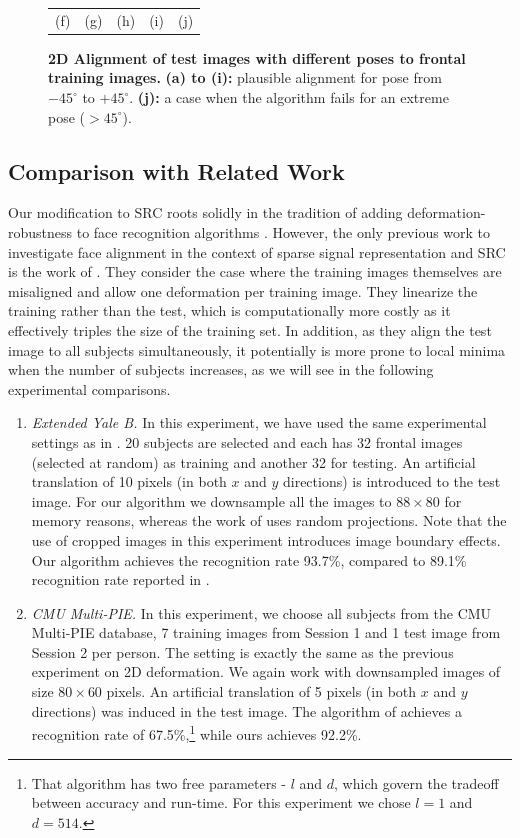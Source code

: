 \documentclass[10pt,journal,letterpaper,compsoc]{IEEEtran} %
\begin{document}
\begin{figure}
{\begin{tabular}{ccccc}
(f) & (g) & (h) & (i) & (j) \vspace{0mm}
\end{tabular}
}
\caption{{\bf 2D Alignment of test images with different poses to frontal training images.} {\bf (a) to (i):}  plausible alignment for pose from $-45^{\circ}$
to $+45^{\circ}$. {\bf (j):} a case when the algorithm fails for an extreme pose ($>45^{\circ}$).
}\label{fig:pose-alignment} \vspace{0mm}
\end{figure}

\subsection{Comparison with Related Work}
Our modification to SRC roots solidly in the tradition of
adding deformation-robustness to face recognition algorithms
\cite{Cootes2001-PAMI,Gross2006-PAMI,Wiskott1997-PAMI}.
However, the only previous work to investigate face alignment
in the context of sparse signal representation and SRC is the
work of \cite{Huang2008-CVPR}. They consider the case where the
training images themselves are misaligned and allow one
deformation per training image. They linearize the training
rather than the test, which is computationally more costly as
it effectively triples the size of the training set. In
addition, as they align the test image to all subjects
simultaneously, it potentially is more prone to local minima
when the number of subjects increases, as we will see in the
following experimental comparisons.
\begin{enumerate}
\item {\em Extended Yale B.} In this experiment, we have
    used the same experimental settings as in
    \cite{Huang2008-CVPR}. 20 subjects are selected and
    each has 32 frontal images (selected at random) as
    training and another 32 for testing. An artificial
    translation of 10 pixels (in both $x$ and $y$
    directions) is introduced to the test image. For our
    algorithm we downsample all the images to $88\times
    80$ for memory reasons, whereas the work of
    \cite{Huang2008-CVPR} uses random projections.
Note that the use of cropped images in this experiment introduces image boundary effects.
    Our
    algorithm achieves the recognition rate 93.7\%,
    compared to 89.1\% recognition rate reported in
    \cite{Huang2008-CVPR}.
\item {\em CMU Multi-PIE.} In this experiment, we choose
    all subjects from the CMU Multi-PIE database, 7
    training images from Session 1 and 1 test image from
    Session 2 per person. The setting is exactly the same
    as the previous experiment on 2D deformation. We again
    work with downsampled images of size $80\times 60$ pixels. An
    artificial translation of 5 pixels (in both $x$ and $y$
    directions) was induced in the test image. The
    algorithm of \cite{Huang2008-CVPR} achieves a
    recognition rate of 67.5\%,\footnote{That algorithm has
    two free parameters - $l$ and $d$, which govern the tradeoff between
	accuracy and run-time. For this experiment
    we chose $l = 1$ and $d = 514$.} while ours achieves 92.2\%.
    \end{enumerate}
				
\end{document}
